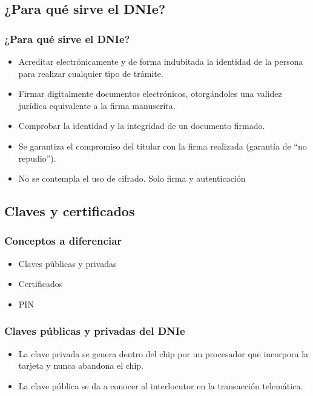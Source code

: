 \documentclass{beamer}
\begin{document}
\subsection{¿Para qué sirve el DNIe?}
\begin{frame}
\frametitle{¿Para qué sirve el DNIe?}

\begin{itemize}
\item Acreditar electrónicamente y de forma indubitada la identidad de la persona para realizar cualquier tipo de trámite.
\item \alert{Firmar} digitalmente documentos electrónicos, otorgándoles una validez jurídica equivalente a la firma manuscrita.
\item Comprobar la \alert{identidad} y la \alert{integridad} de un documento firmado.
\item Se garantiza el compromiso del titular con la firma realizada (garantía de ``no repudio'').
\item \alert{No} se contempla el uso de \alert{cifrado}. Solo firma y autenticación
\end{itemize}

\end{frame}

\subsection{Claves y certificados}

\begin{frame}
\frametitle{Conceptos a diferenciar}

\begin{itemize}
\item Claves públicas y privadas
\item Certificados
\item PIN
\end{itemize}

\end{frame}


\begin{frame}
\frametitle{Claves públicas y privadas del DNIe}

\begin{itemize}
\item La \alert{clave privada} se genera dentro del chip por un procesador que incorpora la tarjeta y nunca abandona el chip. 
\item La \alert{clave pública} se da a conocer al interlocutor en la transacción telemática. 
\end{itemize}

\end{frame}
\end{document}
